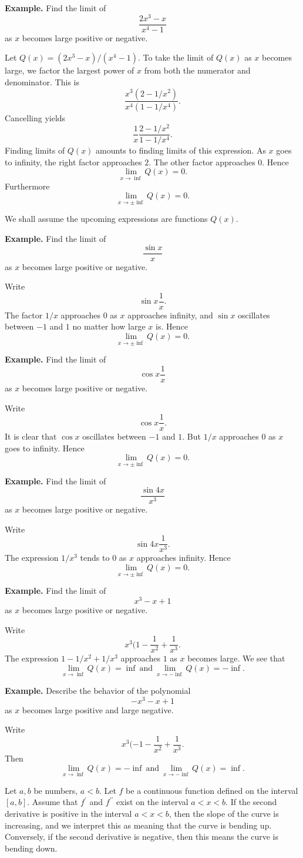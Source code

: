 \textbf{Example.} Find the limit of
\[\frac{2x^3 - x}{x^4 - 1}\]
as $x$ becomes large positive or negative.

Let $Q(x) = (2x^3 - x)/(x^4 - 1)$. To take the limit of $Q(x)$ as $x$ becomes large, we factor the largest power of $x$ from both the numerator and denominator. This is
\[\frac{x^3(2 - 1/x^2)}{x^4(1 - 1/x^4)}.\]
Cancelling yields
\[\frac{1}{x} \frac{2 - 1/x^2}{1 - 1/x^4}.\]
Finding limits of $Q(x)$ amounts to finding limits of this expression. As $x$ goes to infinity, the right factor approaches $2$. The other factor approaches $0$. Hence
\[\lim_{x\to\inf} Q(x) = 0.\]
Furthermore
\[\lim_{x\to\pm\inf} Q(x) = 0.\]

We shall assume the upcoming expressions are functions $Q(x)$.

\textbf{Example.} Find the limit of
\[\frac{\sin x}{x}\]
as $x$ becomes large positive or negative.

Write
\[\sin x \frac{1}{x}.\]
The factor $1/x$ approaches $0$ as $x$ approaches infinity, and $\sin x$ oscillates between $-1$ and $1$ no matter how large $x$ is. Hence
\[\lim_{x\to\pm\inf} Q(x) = 0.\]

\textbf{Example.} Find the limit of
\[\cos x \frac{1}{x}\]
as $x$ becomes large positive or negative.

Write
\[\cos x \frac{1}{x}.\]
It is clear that $\cos x$ oscillates between $-1$ and $1$. But $1/x$ approaches $0$ as $x$ goes to infinity. Hence
\[\lim_{x\to\pm\inf} Q(x) = 0.\]

\textbf{Example.} Find the limit of
\[\frac{\sin 4x}{x^3}\]
as $x$ becomes large positive or negative.

Write
\[\sin 4x \frac{1}{x^3}.\]
The expression $1/x^3$ tends to $0$ as $x$ approaches infinity. Hence
\[\lim_{x\to\pm\inf} Q(x) = 0.\]

\textbf{Example.} Find the limit of
\[x^3 - x + 1\]
as $x$ becomes large positive or negative.

Write
\[x^3(1 - \frac{1}{x^2} + \frac{1}{x^3}.\]
The expression $1 - 1/x^2 + 1/x^3$ approaches $1$ as $x$ becomes large. We see that
\[\lim_{x\to\inf} Q(x) = \inf\: \text{and}\: \lim_{x\to-\inf} Q(x) = -\inf.\]

\textbf{Example.} Describe the behavior of the polynomial
\[-x^3 - x + 1\]
as $x$ becomes large positive and large negative.

Write
\[x^3(-1 - \frac{1}{x^2} + \frac{1}{x^3}.\]
Then
\[\lim_{x\to\inf} Q(x) = -\inf\: \text{and}\: \lim_{x\to-\inf} Q(x) = \inf.\]

Let $a, b$ be numbers, $a < b$. Let $f$ be a continuous function defined on the interval $[a, b]$. Assume that $f^\prime$ and $f^{\prime\prime}$ exist on the interval $a < x < b$. If the second derivative is positive in the interval $a < x < b$, then the slope of the curve is increasing, and we interpret this as meaning that the curve is bending up. Conversely, if the second derivative is 
negative, then this means the curve is bending down.
